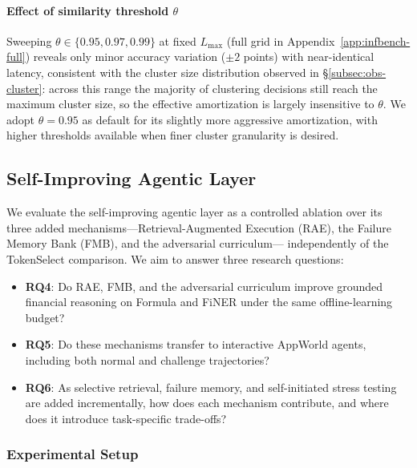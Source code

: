 \documentclass[10pt,conference]{IEEEtran}
\begin{document}
\paragraph{Effect of similarity threshold $\theta$}
Sweeping $\theta \in \{0.95, 0.97, 0.99\}$ at fixed $L_{\max}$
(full grid in Appendix~\ref{app:infbench-full}) reveals
only minor accuracy variation ($\pm 2$ points) with near-identical
latency, consistent with the cluster size distribution observed in
§\ref{subsec:obs-cluster}: across this range the majority of
clustering decisions still reach the maximum cluster size, so the
effective amortization is largely insensitive to $\theta$. We adopt
$\theta = 0.95$ as default for its slightly more aggressive
amortization, with higher thresholds available when finer cluster
granularity is desired.

\subsection{Self-Improving Agentic Layer}
\label{subsec:exp-agentic}

We evaluate the self-improving agentic layer as a controlled ablation
over its three added mechanisms---Retrieval-Augmented Execution (RAE),
the Failure Memory Bank (FMB), and the adversarial curriculum---%
independently of the TokenSelect comparison. We aim to answer three
research questions:
\begin{itemize}
    \item \textbf{RQ4}: Do RAE, FMB, and the adversarial
    curriculum improve grounded financial reasoning on Formula and
    FiNER under the same offline-learning budget?
    \item \textbf{RQ5}: Do these mechanisms transfer to interactive
    AppWorld agents, including both normal and challenge trajectories?
    \item \textbf{RQ6}: As selective retrieval, failure memory, and
    self-initiated stress testing are added incrementally, how does each
    mechanism contribute, and where does it introduce task-specific
    trade-offs?
\end{itemize}

\subsubsection{Experimental Setup}
\label{subsec:agentic-experiments}
\end{document}
